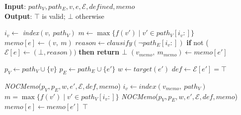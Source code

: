 \documentclass[letterpaper]{article} %
\begin{document}
\begin{algorithm}
\caption{\textbf{\textit{NOCMemo}}}
\small
\textbf{Input}: $path_V, path_E, v, e, \mathcal{E}, \textit{defined}, \textit{memo}$ \\
\textbf{Output}: $\top$ is valid; $\bot$ otherwise
\begin{algorithmic}[1]
        \STATE $i_v \gets$ \textit{index}$(v,\ path_V)$
        \STATE $m \gets \max\{f(v') \mid v' \in path_V[i_v:]\}$
        \STATE $\textit{memo}[e] \gets (v,\ m)$ \label{alg:noc-memo:update}
            \STATE $\textit{reason} \gets \textit{clausify}(\neg path_E[i_v:])$
            \STATE \textbf{if }not ($\mathcal{E}[e] \gets (\bot, \textit{reason}))$ \textbf{then return $\bot$}
        \ENDIF
            \STATE $(v_{memo},\ m_{memo}) \gets \textit{memo}[e']$

            \STATE $p_V \gets path_V \cup \{v\}$
            \STATE $p_E \gets path_E \cup \{e'\}$
            \STATE $w \gets \textit{target}(e')$
            \STATE $\textit{def} \gets \mathcal{E}[e'] = \top$

                \STATE \textit{NOCMemo}($p_V, p_E, w, e', \mathcal{E}, def , \textit{memo}$)\label{alg:noc-memo:check1}
            \ELSE
                \STATE $i_v \gets \textit{index}(v_{memo},\ path_V)$
                \STATE $m = \max\{f(v') \mid v' \in path_V[i_v:]\}$
                    \STATE \textit{NOCMemo}($p_V, p_E, w, e', \mathcal{E}, def , \textit{memo}$)\label{alg:noc-memo:check2}
                \ELSE
                    \STATE $\textit{memo}[e] \gets \textit{memo}[e']$
                \ENDIF
            \ENDIF
        \ENDFOR
    \ENDIF
    \RETURN $\top$
\end{algorithmic}
\label{alg:noc-memo}
\end{algorithm}

\end{document}
